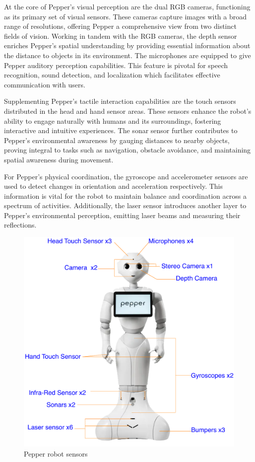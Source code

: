 \documentclass{CSSRforAfrica}
\begin{document}
At the core of Pepper's visual perception are the dual RGB cameras, functioning as its primary 
set of visual sensors. These cameras capture images with a broad range of resolutions, offering 
Pepper a comprehensive view from two distinct fields of vision. Working in tandem with the RGB 
cameras, the depth sensor enriches Pepper's spatial understanding by providing essential 
information about the distance to objects in its environment. The microphones are equipped 
to give Pepper auditory perception capabilities. This feature is pivotal for speech recognition, 
sound detection, and localization which facilitates effective communication with users. 

Supplementing Pepper's tactile interaction capabilities are the touch sensors distributed in 
the head and hand sensor areas. These sensors enhance the robot's ability to engage naturally 
with humans and its surroundings, fostering interactive and intuitive experiences. The sonar 
sensor further contributes to Pepper's environmental awareness by gauging distances to nearby 
objects, proving integral to tasks such as navigation, obstacle avoidance, and maintaining 
spatial awareness during movement.

For Pepper's physical coordination, the gyroscope and accelerometer sensors are used to detect 
changes in orientation and acceleration respectively. This information is vital for 
the robot to maintain balance and coordination across a spectrum of activities. 
Additionally, the laser sensor introduces another layer to Pepper's environmental 
perception, emitting laser beams and measuring their reflections. 

\begin{figure}[!hbpt]
	\centering
	\includegraphics[scale=0.51]{images/Pepper_Sensor.pdf}
	\caption{Pepper robot sensors}
	\label{fig: Pepper robot sensor}
\end{figure}
\end{document}
